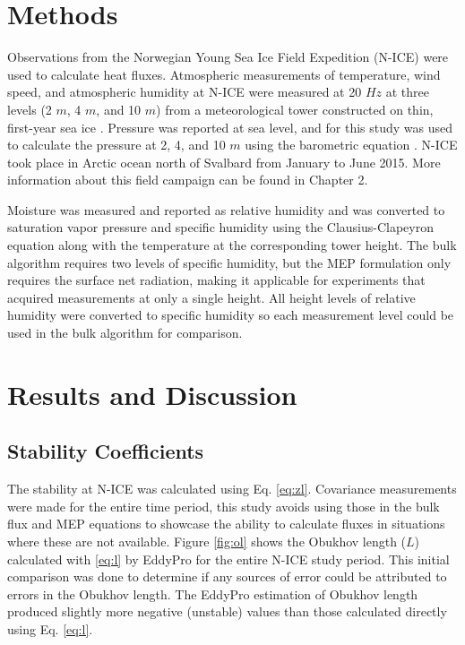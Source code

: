 \section{Methods}
Observations from the Norwegian Young Sea Ice Field Expedition (N-ICE) 
 were used to calculate heat fluxes. Atmospheric measurements of temperature, wind speed, and atmospheric humidity at N-ICE were measured at 20 $Hz$ at three levels (2 $m$, 4 $m$, and 10 $m$) from a meteorological tower constructed on thin, first-year sea ice \citep{walden:2017}. Pressure was reported at sea level, and for this study was used to calculate the pressure at 2, 4, and 10 $m$ using the barometric equation \citep{lente:2020}. N-ICE took place in Arctic ocean north of Svalbard from January to June 2015. More information about this field campaign can be found in Chapter 2.
 
 Moisture was measured and reported as relative humidity and was converted to saturation vapor pressure and specific humidity using the Clausius-Clapeyron equation \citep{iribarne:1981} along with the temperature at the corresponding tower height. The bulk algorithm requires two levels of specific humidity, but the MEP formulation only requires the surface net radiation, making it applicable for experiments that acquired measurements at only a single height. All height levels of relative humidity were converted to specific humidity so each measurement level could be used in the bulk algorithm for comparison. 

\section{Results and Discussion}

\subsection{Stability Coefficients}
The stability at N-ICE was calculated using Eq. \ref{eq:zl}. Covariance measurements were made for the entire time period, this study avoids using those in the bulk flux and MEP equations to showcase the ability to calculate fluxes in situations where these are not available. Figure \ref{fig:ol} shows the Obukhov length ($L$) calculated with \ref{eq:l} by EddyPro for the entire N-ICE study period. This initial comparison was done to determine if any sources of error could be attributed to errors in the Obukhov length. The EddyPro estimation of Obukhov length produced slightly more negative (unstable) values than those calculated directly using Eq. \ref{eq:l}. 

